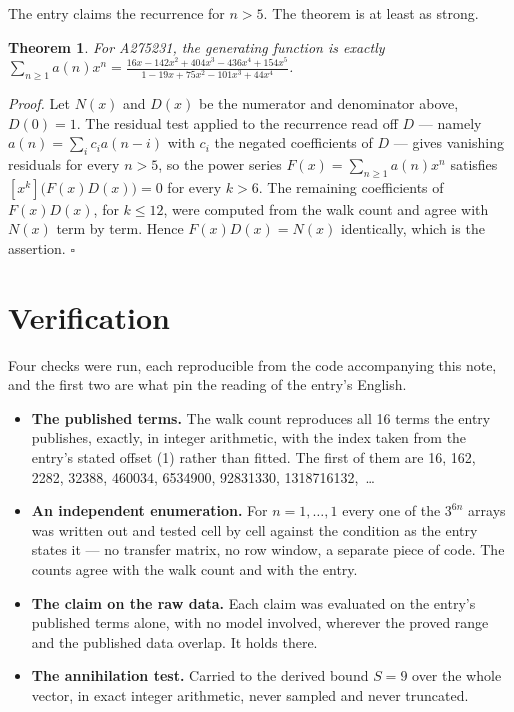 \documentclass[11pt]{article}
\newtheorem{theorem}{Theorem}
\theoremstyle{definition}
\begin{document}
The entry claims the recurrence for $n > 5$. The theorem is at least as strong.

\begin{theorem} For A275231, the generating function is exactly $\sum_{n\ge 1} a(n)x^n = \frac{16x - 142x^{2} + 404x^{3} - 436x^{4} + 154x^{5}}{1 - 19x + 75x^{2} - 101x^{3} + 44x^{4}}$.\end{theorem}

{\itshape Proof.} Let $N(x)$ and $D(x)$ be the numerator and denominator above, $D(0)=1$. The residual test applied to the recurrence read off $D$ --- namely $a(n) = \sum_i c_i a(n-i)$ with $c_i$ the negated coefficients of $D$ --- gives vanishing residuals for every $n > 5$, so the power series $F(x)=\sum_{n\ge 1}a(n)x^n$ satisfies $[x^k]\bigl(F(x)D(x)\bigr) = 0$ for every $k > 6$. The remaining coefficients of $F(x)D(x)$, for $k \le 12$, were computed from the walk count and agree with $N(x)$ term by term. Hence $F(x)D(x) = N(x)$ identically, which is the assertion. $\square$

\section{Verification}

Four checks were run, each reproducible from the code accompanying this note, and the first two are what pin the reading of the entry's English.

\begin{itemize}

\item {\bfseries The published terms.} The walk count reproduces all 16 terms the entry publishes, exactly, in integer arithmetic, with the index taken from the entry's stated offset (1) rather than fitted. The first of them are 16, 162, 2282, 32388, 460034, 6534900, 92831330, 1318716132,~\dots

\item {\bfseries An independent enumeration.} For $n = 1,\dots,1$ every one of the $3^{6n}$ arrays was written out and tested cell by cell against the condition as the entry states it --- no transfer matrix, no row window, a separate piece of code. The counts agree with the walk count and with the entry.

\item {\bfseries The claim on the raw data.} Each claim was evaluated on the entry's published terms alone, with no model involved, wherever the proved range and the published data overlap. It holds there.

\item {\bfseries The annihilation test.} Carried to the derived bound $S = 9$ over the whole vector, in exact integer arithmetic, never sampled and never truncated.

\end{itemize}
\end{document}
